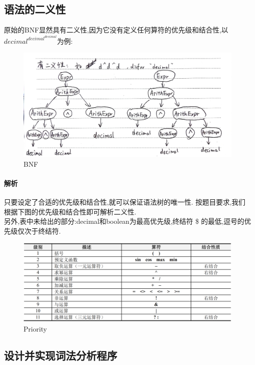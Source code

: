 \documentclass{article}
\begin{document}
\subsection{语法的二义性}
原始的BNF显然具有二义性,因为它没有定义任何算符的优先级和结合性,以$decimal ^{ {decimal} ^ {decimal}}$为例:
\begin{figure}[H]
    \centering
    \includegraphics[width=0.7\linewidth]{1.png}
    \caption{BNF}
    \label{fig:enter-label}
\end{figure}
\paragraph{解析} 只要设定了合适的优先级和结合性,就可以保证语法树的唯一性. 按题目要求,我们根据下图的优先级和结合性即可解析二义性.\\
另外,表中未给出的部分:decimal和boolean为最高优先级,终结符 \$ 的最低,逗号的优先级仅次于终结符.
\begin{figure}[H]
    \centering
    \includegraphics[width=1\linewidth]{2.png}
    \caption{Priority}
    \label{fig:prio}
\end{figure}

\subsection{设计并实现词法分析程序}
\end{document}
